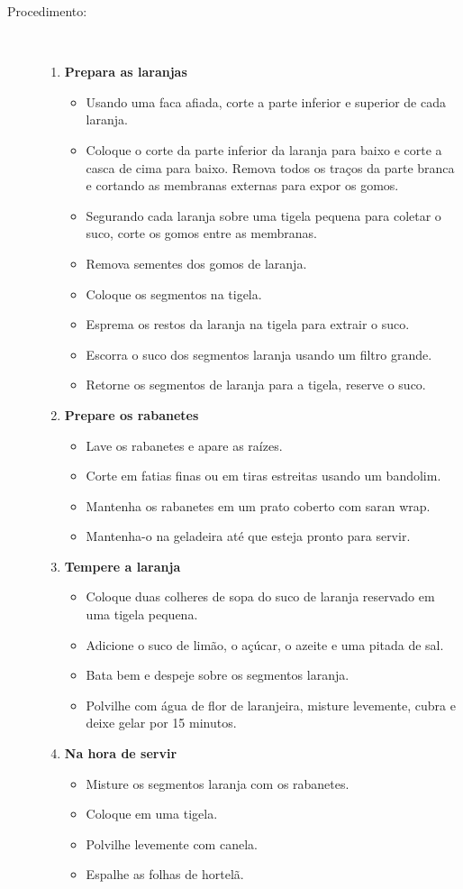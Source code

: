 \documentclass [11pt, papel de carta] {article}
\begin{document}
\begin {description}
\item [Procedimento:] \ \\
\begin {enumerate}
\item {\bf Prepara as laranjas}
\begin {itemize}
\item Usando uma faca afiada, corte a parte inferior e superior de cada laranja.
\item Coloque o corte da parte inferior da laranja para baixo e corte a casca de cima para baixo. Remova todos os traços da parte branca e cortando as membranas externas para expor os gomos.
\item Segurando cada laranja sobre uma tigela pequena para coletar o suco, corte os gomos entre as membranas.
\item Remova sementes dos gomos de laranja.
\item Coloque os segmentos na tigela.
\item Esprema os restos da laranja na tigela para extrair o suco.
\item Escorra o suco dos segmentos laranja usando um filtro grande.
\item Retorne os segmentos de laranja para a tigela, reserve o suco.
\end {itemize}
\item {\bf Prepare os rabanetes}
\begin {itemize}
\item Lave os rabanetes e apare as raízes.
\item Corte em fatias finas ou em tiras estreitas usando um bandolim.
\item Mantenha os rabanetes em um prato coberto com saran wrap.
\item Mantenha-o na geladeira até que esteja pronto para servir.
\end {itemize}
\item {\bf Tempere a laranja}
\begin {itemize}
\item Coloque duas colheres de sopa do suco de laranja reservado em uma tigela pequena.
\item Adicione o suco de limão, o açúcar, o azeite e uma pitada de sal.
\item Bata bem e despeje sobre os segmentos laranja.
\item Polvilhe com água de flor de laranjeira, misture levemente, cubra e deixe gelar por 15 minutos.
\end {itemize}
\item {\bf Na hora de servir}
\begin {itemize}
\item Misture os segmentos laranja com os rabanetes.
\item Coloque em uma tigela.
\item Polvilhe levemente com canela.
\item Espalhe as folhas de hortelã.
\end {itemize}
\end {enumerate}
\end {description}
\end{document}
